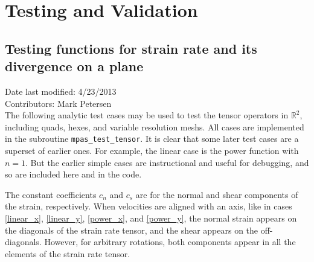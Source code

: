 \documentclass[11pt]{report}
\begin{document}



\chapter{Testing and Validation}

\section{Testing functions for strain rate and its divergence on a plane}
Date last modified: 4/23/2013 \\
Contributors: Mark Petersen \\

The following analytic test cases may be used to test the tensor operators in $\mathbb{R}^2$, including quads, hexes, and variable resolution meshs.  All cases are implemented in the subroutine \verb|mpas_test_tensor|.  It is clear that some later test cases are a superset of earlier ones.  For example, the linear case is the power function with $n=1$.  But the earlier simple cases are instructional and useful for debugging, and so are included here and in the code.

The constant coefficients $c_n$ and $c_s$ are for the normal and shear components of the strain, respectively.  When velocities are aligned with an axis, like in cases \ref{linear_x}, \ref{linear_y}, \ref{power_x}, and \ref{power_y}, the normal strain appears on the diagonals of the strain rate tensor, and the shear appears on the off-diagonals.  However, for arbitrary rotations, both components appear in all the elements of the strain rate tensor.
\end{document}
